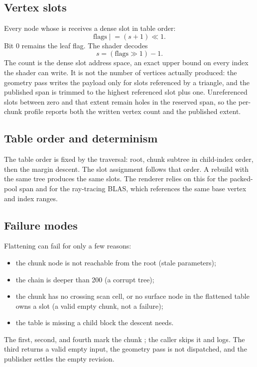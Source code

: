 \subsection{Vertex slots}

Every node whose  is  receives a dense slot in
table order:
\begin{equation}
  \text{flags} \mathrel{|}= (s+1)\ll1.
\end{equation}
Bit 0 remains the leaf flag.  The shader decodes
\begin{equation}
  s = (\text{flags}\gg1)-1.
\end{equation}
The count is the dense slot address space, an exact upper bound on every
index the shader can write.  It is not the number of vertices actually
produced: the geometry pass writes the payload only for slots referenced by
a triangle, and the published span is trimmed to the highest referenced
slot plus one.  Unreferenced slots between zero and that extent remain holes
in the reserved span, so the per-chunk profile reports both the written
vertex count and the published extent.

\subsection{Table order and determinism}

The table order is fixed by the traversal: root, chunk subtree in
child-index order, then the margin descent.  The slot assignment follows
that order.  A rebuild with the same tree produces the same slots.  The
renderer relies on this for the packed-pool span and for the ray-tracing
BLAS, which references the same base vertex and index ranges.

\subsection{Failure modes}

Flattening can fail for only a few reasons:
\begin{itemize}
\item the chunk node is not reachable from the root (stale parameters);
\item the chain is deeper than 200 (a corrupt tree);
\item the chunk has no crossing scan cell, or no surface node in the
  flattened table owns a slot (a valid empty chunk, not a failure);
\item the table is missing a child block the descent needs.
\end{itemize}
The first, second, and fourth mark the chunk ; the
caller skips it and logs.  The third returns a valid empty input, the
geometry pass is not dispatched, and the publisher settles the empty
revision.
